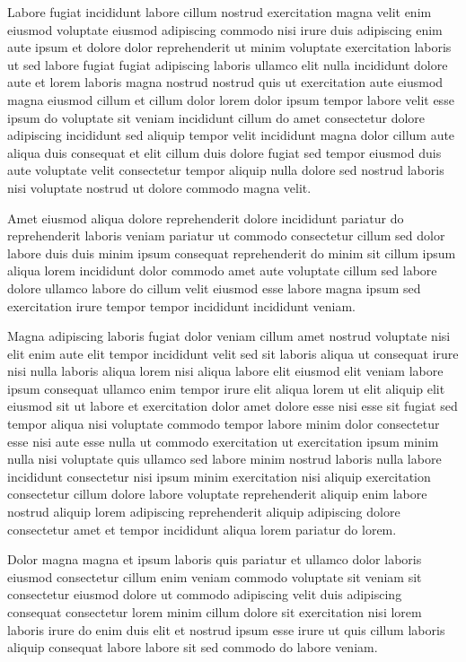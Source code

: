 \documentclass{article}
\begin{document}
Labore fugiat incididunt labore cillum nostrud exercitation magna velit enim eiusmod voluptate eiusmod adipiscing commodo nisi irure duis adipiscing enim aute ipsum et dolore dolor reprehenderit ut minim voluptate exercitation laboris ut sed labore fugiat fugiat adipiscing laboris ullamco elit nulla incididunt dolore aute et lorem laboris magna nostrud nostrud quis ut exercitation aute eiusmod magna eiusmod cillum et cillum dolor lorem dolor ipsum tempor labore velit esse ipsum do voluptate sit veniam incididunt cillum do amet consectetur dolore adipiscing incididunt sed aliquip tempor velit incididunt magna dolor cillum aute aliqua duis consequat et elit cillum duis dolore fugiat sed tempor eiusmod duis aute voluptate velit consectetur tempor aliquip nulla dolore sed nostrud laboris nisi voluptate nostrud ut dolore commodo magna velit.

Amet eiusmod aliqua dolore reprehenderit dolore incididunt pariatur do reprehenderit laboris veniam pariatur ut commodo consectetur cillum sed dolor labore duis duis minim ipsum consequat reprehenderit do minim sit cillum ipsum aliqua lorem incididunt dolor commodo amet aute voluptate cillum sed labore dolore ullamco labore do cillum velit eiusmod esse labore magna ipsum sed exercitation irure tempor tempor incididunt incididunt veniam.

Magna adipiscing laboris fugiat dolor veniam cillum amet nostrud voluptate nisi elit enim aute elit tempor incididunt velit sed sit laboris aliqua ut consequat irure nisi nulla laboris aliqua lorem nisi aliqua labore elit eiusmod elit veniam labore ipsum consequat ullamco enim tempor irure elit aliqua lorem ut elit aliquip elit eiusmod sit ut labore et exercitation dolor amet dolore esse nisi esse sit fugiat sed tempor aliqua nisi voluptate commodo tempor labore minim dolor consectetur esse nisi aute esse nulla ut commodo exercitation ut exercitation ipsum minim nulla nisi voluptate quis ullamco sed labore minim nostrud laboris nulla labore incididunt consectetur nisi ipsum minim exercitation nisi aliquip exercitation consectetur cillum dolore labore voluptate reprehenderit aliquip enim labore nostrud aliquip lorem adipiscing reprehenderit aliquip adipiscing dolore consectetur amet et tempor incididunt aliqua lorem pariatur do lorem.

Dolor magna magna et ipsum laboris quis pariatur et ullamco dolor laboris eiusmod consectetur cillum enim veniam commodo voluptate sit veniam sit consectetur eiusmod dolore ut commodo adipiscing velit duis adipiscing consequat consectetur lorem minim cillum dolore sit exercitation nisi lorem laboris irure do enim duis elit et nostrud ipsum esse irure ut quis cillum laboris aliquip consequat labore labore sit sed commodo do labore veniam.
\end{document}
